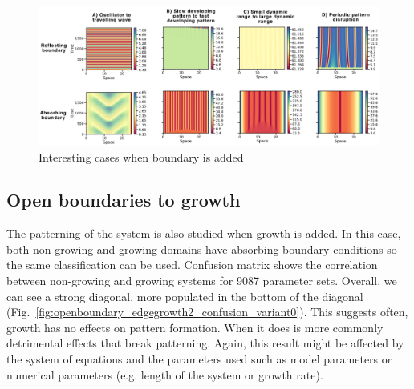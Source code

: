 \begin{figure}[H] %
    \centering
    \begin{adjustbox}{center}
        \includegraphics[width=1\textwidth]{chapters/Chapter 1/interesting_cases_openboundary} %
    \end{adjustbox}
    \caption{Interesting cases when boundary is added}
    \label{fig:interesting_cases_openboundary} %
\end{figure}


\subsection{Open boundaries to growth}
The patterning of the system is also studied when growth is added.
In this case, both non-growing and growing domains have absorbing boundary conditions so the same classification can be used.
Confusion matrix shows the correlation between non-growing and growing systems for 9087 parameter sets.
Overall, we can see a strong diagonal, more populated in the bottom of the diagonal (Fig.~\ref{fig:openboundary_edgegrowth2_confusion_variant0}). This suggests often, growth has no effects on pattern formation.
When it does is more commonly detrimental effects that break patterning.
Again, this result might be affected by the system of equations and the parameters used such as model parameters or numerical parameters (e.g. length of the system or growth rate). %

